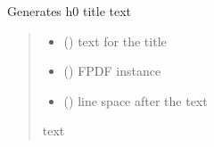 \documentclass[letterpaper,10pt,english]{sphinxmanual}
\begin{document}
\begin{fulllineitems}
\label{\detokenize{auxilary_functions:auxilary_functions.h0}}
\pysigstartsignatures
{}
\pysigstopsignatures
\sphinxAtStartPar
Generates h0 title text
\begin{quote}\begin{description}
\begin{itemize}
\item {} 
\sphinxAtStartPar
{} () \textendash{} text for the title

\item {} 
\sphinxAtStartPar
{} () \textendash{} FPDF instance

\item {} 
\sphinxAtStartPar
{} () \textendash{} line space after the text

\end{itemize}

\sphinxAtStartPar
text

\end{description}\end{quote}

\end{fulllineitems}

\end{document}
